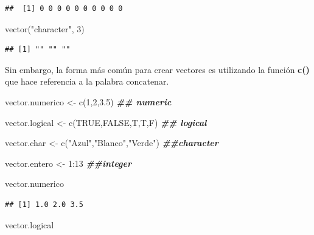 \documentclass[
  12pt,
]{book}
\newenvironment{Shaded}{\begin{snugshade}}{\end{snugshade}}
\newcommand{\ConstantTok}[1]{\textcolor[rgb]{0.00,0.00,0.00}{#1}}
\newcommand{\DecValTok}[1]{\textcolor[rgb]{0.00,0.00,0.81}{#1}}
\newcommand{\DocumentationTok}[1]{\textcolor[rgb]{0.56,0.35,0.01}{\textbf{\textit{#1}}}}
\newcommand{\FloatTok}[1]{\textcolor[rgb]{0.00,0.00,0.81}{#1}}
\newcommand{\FunctionTok}[1]{\textcolor[rgb]{0.00,0.00,0.00}{#1}}
\newcommand{\NormalTok}[1]{#1}
\newcommand{\OtherTok}[1]{\textcolor[rgb]{0.56,0.35,0.01}{#1}}
\newcommand{\SpecialCharTok}[1]{\textcolor[rgb]{0.00,0.00,0.00}{#1}}
\newcommand{\StringTok}[1]{\textcolor[rgb]{0.31,0.60,0.02}{#1}}
\begin{document}
\begin{verbatim}
##  [1] 0 0 0 0 0 0 0 0 0 0
\end{verbatim}

\begin{Shaded}
\begin{Highlighting}[]
\FunctionTok{vector}\NormalTok{(}\StringTok{"character"}\NormalTok{, }\DecValTok{3}\NormalTok{)}
\end{Highlighting}
\end{Shaded}

\begin{verbatim}
## [1] "" "" ""
\end{verbatim}

Sin embargo, la forma más común para crear vectores es utilizando la función \textbf{c()} que hace referencia a la palabra concatenar.

\begin{Shaded}
\begin{Highlighting}[]
\NormalTok{vector.numerico }\OtherTok{\textless{}{-}} \FunctionTok{c}\NormalTok{(}\DecValTok{1}\NormalTok{,}\DecValTok{2}\NormalTok{,}\FloatTok{3.5}\NormalTok{)   }\DocumentationTok{\#\# numeric}

\NormalTok{vector.logical }\OtherTok{\textless{}{-}} \FunctionTok{c}\NormalTok{(}\ConstantTok{TRUE}\NormalTok{,}\ConstantTok{FALSE}\NormalTok{,T,T,F) }\DocumentationTok{\#\# logical}

\NormalTok{vector.char }\OtherTok{\textless{}{-}} \FunctionTok{c}\NormalTok{(}\StringTok{"Azul"}\NormalTok{,}\StringTok{"Blanco"}\NormalTok{,}\StringTok{"Verde"}\NormalTok{) }\DocumentationTok{\#\#character}

\NormalTok{vector.entero }\OtherTok{\textless{}{-}} \DecValTok{1}\SpecialCharTok{:}\DecValTok{13}   \DocumentationTok{\#\#integer}
\end{Highlighting}
\end{Shaded}

\begin{Shaded}
\begin{Highlighting}[]
\NormalTok{vector.numerico}
\end{Highlighting}
\end{Shaded}

\begin{verbatim}
## [1] 1.0 2.0 3.5
\end{verbatim}

\begin{Shaded}
\begin{Highlighting}[]
\NormalTok{vector.logical}
\end{Highlighting}
\end{Shaded}
\end{document}
